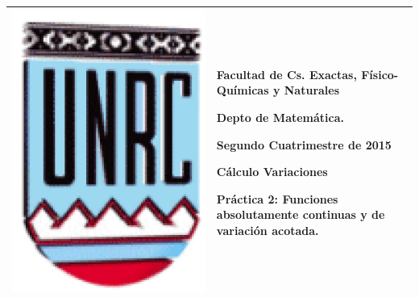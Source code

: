 \documentclass{article}
\begin{document}
\setlength{\unitlength}{1cm}
%
\setlength{\extrarowheight}{5mm}
%

\setlength{\extrarowheight}{-5mm}
\noindent\begin{tabular}{m{} m{}}\hline\hline
\includegraphics[scale=.4]{imagenes/unrc.jpg} &
\begin{bfseries}  \begin{scshape}
Facultad de Cs. Exactas, Físico-Químicas y Naturales\par
        Depto de Matem\'atica.\par
        Segundo Cuatrimestre de 2015\par
        Cálculo Variaciones \par
        Práctica 2: Funciones absolutamente continuas y de variación acotada.

\end{scshape}
\end{bfseries}
\\
\hline\hline
\end{tabular}
\renewcommand{\theenumi}{\alph{enumi}}
\end{document}
